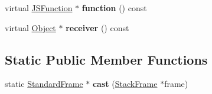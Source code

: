 \begin{DoxyCompactItemize}
\item 
virtual \hyperlink{classv8_1_1internal_1_1_j_s_function}{J\+S\+Function} $\ast$ {\bfseries function} () const \hypertarget{classv8_1_1internal_1_1_standard_frame_a04e444afdd5a09a39d2f25d99a37c2f5}{}\label{classv8_1_1internal_1_1_standard_frame_a04e444afdd5a09a39d2f25d99a37c2f5}

\item 
virtual \hyperlink{classv8_1_1internal_1_1_object}{Object} $\ast$ {\bfseries receiver} () const \hypertarget{classv8_1_1internal_1_1_standard_frame_a33f1993083f48ca720f3e218d10f7e69}{}\label{classv8_1_1internal_1_1_standard_frame_a33f1993083f48ca720f3e218d10f7e69}

\end{DoxyCompactItemize}
\subsection*{Static Public Member Functions}
\begin{DoxyCompactItemize}
\item 
static \hyperlink{classv8_1_1internal_1_1_standard_frame}{Standard\+Frame} $\ast$ {\bfseries cast} (\hyperlink{classv8_1_1_stack_frame}{Stack\+Frame} $\ast$frame)\hypertarget{classv8_1_1internal_1_1_standard_frame_ac92588167f70de41f1eaefb2f8addc14}{}\label{classv8_1_1internal_1_1_standard_frame_ac92588167f70de41f1eaefb2f8addc14}

\end{DoxyCompactItemize}
